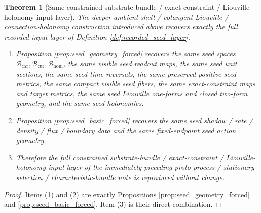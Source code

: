 \documentclass[11pt]{article}
\newcommand{\TensorSeedSpace}{\mathcal B_{\mathrm{car}}}
\newcommand{\CurSeedSpace}{\mathcal B_{\mathrm{cur}}}
\newcommand{\HomSeedSpace}{\mathcal B_{\mathrm{hom}}}
\newtheorem{theorem}{Theorem}
\begin{document}
\begin{theorem}[Same constrained substrate-bundle / exact-constraint / Liouville-holonomy input layer]
\label{thm:same_seed_input}
The deeper ambient-shell / cotangent-Liouville / connection-holonomy construction introduced above recovers exactly the full recorded input layer of Definition \ref{def:recorded_seed_layer}.
\begin{enumerate}
    \item Proposition \ref{prop:seed_geometry_forced} recovers the same seed spaces \(\TensorSeedSpace,\CurSeedSpace,\HomSeedSpace\), the same visible seed readout maps, the same seed unit sections, the same seed time reversals, the same preserved positive seed metrics, the same compact visible seed fibers, the same exact-constraint maps and target metrics, the same seed Liouville one-forms and closed two-form geometry, and the same seed holonomies.
    \item Proposition \ref{prop:seed_basic_forced} recovers the same seed shadow / rate / density / flux / boundary data and the same fixed-endpoint seed action geometry.
    \item Therefore the full constrained substrate-bundle / exact-constraint / Liouville-holonomy input layer of the immediately preceding proto-process / stationary-selection / characteristic-bundle note is reproduced without change.
\end{enumerate}
\end{theorem}

\begin{proof}
Items (1) and (2) are exactly Propositions \ref{prop:seed_geometry_forced} and \ref{prop:seed_basic_forced}. Item (3) is their direct combination.
\end{proof}
\end{document}
